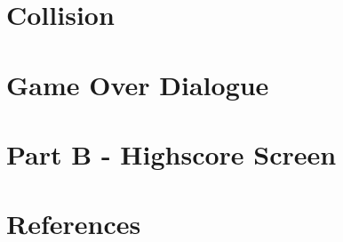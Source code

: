 \documentclass{article}
\begin{document}
\section{Collision}

\clearpage


\section{Game Over Dialogue}

\clearpage

\section{Part B - Highscore Screen}

\clearpage



\section{References}

\clearpage
\end{document}
